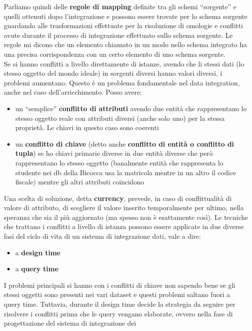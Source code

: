 \documentclass[a4paper,12pt, oneside]{book}
\begin{document}
Parliamo quindi delle \textbf{regole di mapping} definite tra gli schemi
``sorgente'' e quelli ottenuti dopo l'integrazione e possono essere trovate per
lo schema sorgente guardando alle trasformazioni effettuate per la risoluzione
di omologie e conflitti avute durante il processo di integrazione effettuato
sullo schema sorgente. Le regole mi dicono che un elemento chiamato in un modo
nello schema integrato ha una precisa corrispondenza con un certo elemento di
uno schema sorgente.\\
Se si hanno conflitti a livello direttamente di istanze, avendo che li stessi
dati (lo stesso oggetto del mondo ideale) in sorgenti diversi hanno valori
diversi, i problemi aumentano. Questo è un problema fondamentale nel data
integration, anche nel caso dell'arricchimento. Posso avere:
\begin{itemize}
  \item un ``semplice'' \textbf{conflitto di attributi} avendo due entità che
  rappresentano lo stesso oggetto reale con attributi diversi (anche solo uno)
  per la stessa proprietà. Le chiavi in questo caso sono coerenti
  \item un \textbf{conflitto di chiave} (detto anche \textbf{conflitto di entità
    \textnormal{o} conflitto di tupla}) se ho chiavi primarie diverse in due
  entità diverse che però rappresentano lo stesso oggetto (banalmente entità
  che rappresenta lo studente nei db della Bicocca usa la matricola mentre in un
  altro il codice fiscale) mentre gli altri attributi coincidono
\end{itemize}
Una scelta di soluzione, detta \textbf{currency}, prevede, in caso di
conflittualità di valore di attributo, di scegliere il valore inserito
temporalmente per ultimo, nella speranza che sia il più aggiornato (ma spesso
non è esattamente così). Le tecniche che trattano i conflitti a livello di
istanza possono essere applicate in due diverse fasi del ciclo di vita di un
sistema di integrazione dati, vale a dire:
\begin{itemize}
  \item a \textbf{design time}
  \item a \textbf{query time}
\end{itemize}
I problemi principali si hanno con i conflitti di chiave non sapendo bene se
gli stessi oggetti sono presenti nei vari dataset e questi problemi saltano
fuori a query time. Tuttavia, durante il design time decide la
strategia da seguire per risolvere i conflitti prima che le query vengano
elaborate, ovvero nella fase di progettazione del sistema di integrazione dei
\end{document}
